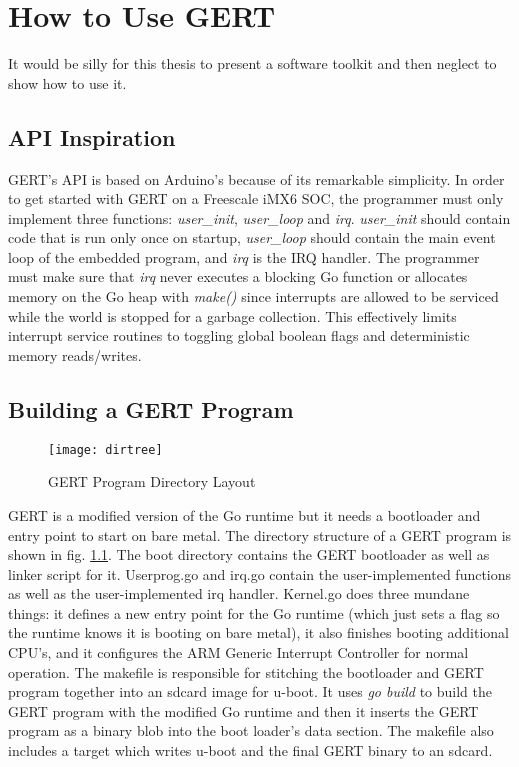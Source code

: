 \chapter{How to Use GERT}

It would be silly for this thesis to present a software toolkit and then
neglect to show how to use it.

\section{API Inspiration}
GERT's API is based on Arduino's because of its remarkable simplicity. In order to
get started with GERT on a Freescale iMX6 SOC, the programmer must only implement three functions: \textit{user\_init},
\textit{user\_loop} and \textit{irq}. \textit{user\_init} should contain code that is run only once
on startup, \textit{user\_loop} should contain the main event loop of the embedded program, and
\textit{irq} is the IRQ handler. The programmer must make sure that \textit{irq} never executes
a blocking Go function or allocates memory on the Go heap with \textit{make()}
since interrupts are allowed to be serviced while the world is stopped for
a garbage collection. This effectively limits interrupt service routines to toggling
global boolean flags and deterministic memory reads/writes.

\section{Building a GERT Program}

\begin{figure}[h]
\begin{center}
  \texttt{[image: dirtree]}
\end{center}
  \caption{GERT Program Directory Layout} \label{fig:dtree}
\end{figure}

GERT is a modified version of the Go runtime but it needs a bootloader
and entry point to start on bare metal. The directory structure of a GERT
program is shown in fig. \ref{fig:dtree}. The boot directory contains the GERT
bootloader as well as linker script for it. Userprog.go and irq.go contain
the user-implemented functions as well as the user-implemented irq handler.
Kernel.go does three mundane things: it defines a new entry point for the Go runtime
(which just sets a flag so the runtime knows it is booting on bare metal),
it also finishes booting additional CPU's, and it configures the ARM Generic Interrupt Controller for normal operation. The makefile
is responsible for stitching the bootloader and GERT program together into an
sdcard image for u-boot. It uses \textit{go build} to build the GERT program
with the modified Go runtime and then it inserts the GERT program as a binary blob
into the boot loader's data section. The makefile also includes a target which writes
u-boot and the final GERT binary to an sdcard.


